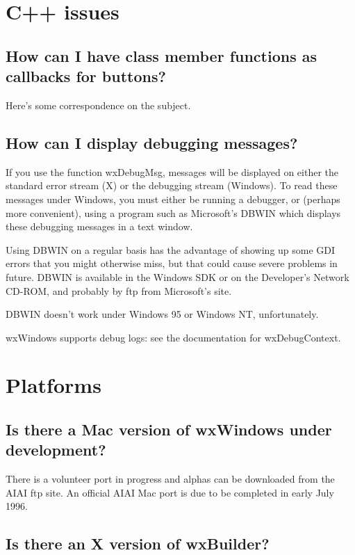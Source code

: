 \chapter{C++ issues}

\section{How can I have class member functions as callbacks
for buttons?}

Here's some correspondence on the subject.


%
\section{How can I display debugging messages?}

If you use the function wxDebugMsg, messages will be displayed on either
the standard error stream (X) or the debugging stream (Windows). To read
these messages under Windows, you must either be running a debugger,
or (perhaps more convenient), using a program such as Microsoft's DBWIN
which displays these debugging messages in a text window.

Using DBWIN on a regular basis has the advantage of showing up some GDI
errors that you might otherwise miss, but that could cause severe
problems in future. DBWIN is available in the Windows SDK or
on the Developer's Network CD-ROM, and probably by ftp from Microsoft's
site.

DBWIN doesn't work under Windows 95 or Windows NT, unfortunately.

wxWindows supports debug logs: see the documentation for wxDebugContext.

\chapter{Platforms}

\section{Is there a Mac version of wxWindows under development?}

There is a volunteer port in progress and alphas can be downloaded from the
AIAI ftp site. An official AIAI Mac port is due to be completed in early July 1996.

\section{Is there an X version of wxBuilder?}

